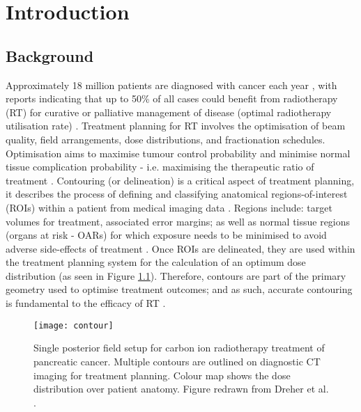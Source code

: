 \chapter{Introduction} \label{ch:introduction}

\section{Background}
Approximately 18 million patients are diagnosed with cancer each year \cite{Bray2019}, with reports indicating that up to 50\% of all cases could benefit from radiotherapy (RT) for curative or palliative management of disease (optimal radiotherapy utilisation rate) \cite{Barton2014}. 
 Treatment planning for RT involves the optimisation of beam quality, field arrangements, dose distributions, and fractionation schedules. Optimisation aims to maximise tumour control probability and minimise normal tissue complication probability - i.e. maximising the therapeutic ratio of treatment \cite{iaea2016}. Contouring (or delineation) is a critical aspect of treatment planning, it describes the process of defining and classifying anatomical regions-of-interest (ROIs) within a patient from medical imaging data \cite{iaea2016}. Regions include: target volumes for treatment, associated error margins; as well as normal tissue regions (organs at risk - OARs) for which exposure needs to be minimised to avoid adverse side-effects of treatment \cite{iaea2016}. Once ROIs are delineated, they are used within the treatment planning system for the calculation of an optimum dose distribution (as seen in Figure \ref{fig:contour}). Therefore, contours are part of the primary geometry used to optimise treatment outcomes; and as such, accurate contouring is fundamental to the efficacy of RT \cite{Nikolov_2018}.


\begin{figure}[!htb]
	\begin{center}
		\texttt{[image: contour]}
		\caption{Single posterior field setup for carbon ion radiotherapy treatment of pancreatic cancer. Multiple contours are outlined on diagnostic CT imaging for treatment planning. Colour map shows the dose distribution over patient anatomy. Figure redrawn from Dreher et al. \cite{Dreher2017}.}
		\label{fig:contour}
	\end{center}
\end{figure}

